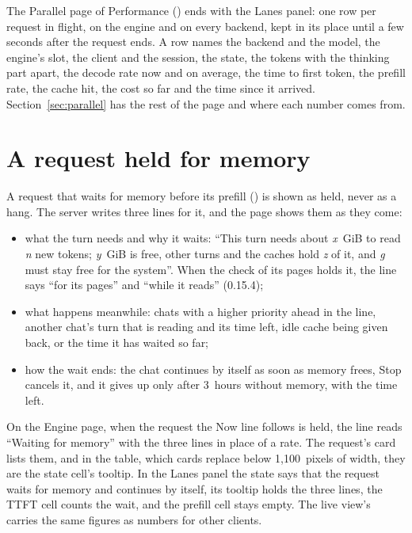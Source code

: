 The Parallel page of Performance () ends with the Lanes panel: one row per request in flight, on the engine and on every backend, kept in its place until a few seconds after the request ends. A row names the backend and the model, the engine's slot, the client and the session, the state, the tokens with the thinking part apart, the decode rate now and on average, the time to first token, the prefill rate, the cache hit, the cost so far and the time since it arrived. Section~\ref{sec:parallel} has the rest of the page and where each number comes from.

\section{A request held for memory}\label{sec:dash-held}

A request that waits for memory before its prefill () is shown as held, never as a hang. The server writes three lines for it, and the page shows them as they come:

\begin{itemize}
\item what the turn needs and why it waits: \enquote{This turn needs about \textit{x}~GiB to read \textit{n} new tokens; \textit{y}~GiB is free, other turns and the caches hold \textit{z} of it, and \textit{g} must stay free for the system}. When the check of its pages holds it, the line says \enquote{for its pages} and \enquote{while it reads} (0.15.4);
\item what happens meanwhile: chats with a higher priority ahead in the line, another chat's turn that is reading and its time left, idle cache being given back, or the time it has waited so far;
\item how the wait ends: the chat continues by itself as soon as memory frees, Stop cancels it, and it gives up only after 3~hours without memory, with the time left.
\end{itemize}

On the Engine page, when the request the Now line follows is held, the line reads \enquote{Waiting for memory} with the three lines in place of a rate. The request's card lists them, and in the table, which cards replace below 1,100~pixels of width, they are the state cell's tooltip. In the Lanes panel the state says that the request waits for memory and continues by itself, its tooltip holds the three lines, the TTFT cell counts the wait, and the prefill cell stays empty. The live view's  carries the same figures as numbers for other clients.

